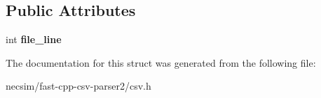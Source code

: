 \subsection*{Public Attributes}
\begin{DoxyCompactItemize}
\item 
int {\bfseries file\+\_\+line}\hypertarget{structio_1_1error_1_1with__file__line_a391298c37172bcdb83aeb3daf65d5a0e}{}\label{structio_1_1error_1_1with__file__line_a391298c37172bcdb83aeb3daf65d5a0e}

\end{DoxyCompactItemize}


The documentation for this struct was generated from the following file\+:\begin{DoxyCompactItemize}
\item 
necsim/fast-\/cpp-\/csv-\/parser2/csv.\+h\end{DoxyCompactItemize}
